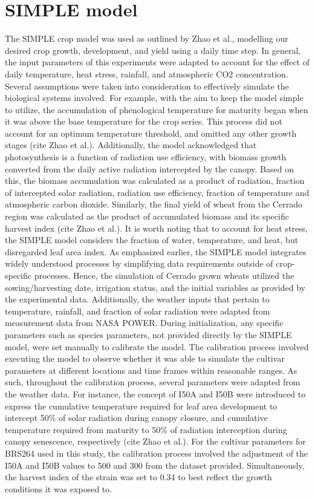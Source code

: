 \documentclass[11pt]{article}
\begin{document}
\section{SIMPLE model}
\label{sec:org2fbf11b}
The SIMPLE crop model was used as outlined by Zhao et al., modelling our desired crop growth, development, and yield using a daily time step. In general, the input parameters of this experiments were adapted to account for the effect of daily temperature, heat stress, rainfall, and atmospheric CO2 concentration. Several assumptions were taken into consideration to effectively simulate the biological systems involved. 
For example, with the aim to keep the model simple to utilize, the accumulation of phenological temperature for maturity began when it was above the base temperature for the crop series. This process did not account for an optimum temperature threshold, and omitted any other growth stages (cite Zhao et al.). Additionally, the model acknowledged that photosynthesis is a function of radiation use efficiency, with biomass growth converted from the daily active radiation intercepted by the canopy. Based on this, the biomass accumulation was calculated as a product of radiation, fraction of intercepted solar radiation, radiation use efficiency, fraction of temperature and atmospheric carbon dioxide. Similarly, the final yield of wheat from the Cerrado region was calculated as the product of accumulated biomass and its specific harvest index (cite Zhao et al.). It is worth noting that to account for heat stress, the SIMPLE model considers the fraction of water, temperature, and heat, but disregarded leaf area index.
As emphasized earlier, the SIMPLE model integrates widely understood processes by simplifying data requirements outside of crop-specific processes. Hence, the simulation of Cerrado grown wheats utilized the sowing/harvesting date, irrigation status, and the initial variables as provided by the experimental data. Additionally, the weather inputs that pertain to temperature, rainfall, and fraction of solar radiation were adapted from measurement data from NASA POWER. During initialization, any specific parameters such as species parameters, not provided directly by the SIMPLE model, were set manually to calibrate the model. 
The calibration process involved executing the model to observe whether it was able to simulate the cultivar parameters at different locations and time frames within reasonable ranges. As such, throughout the calibration process, several parameters were adapted from the weather data. For instance, the concept of I50A and I50B were introduced to express the cumulative temperature required for leaf area development to intercept 50\% of solar radiation during canopy closure, and cumulative temperature required from maturity to 50\% of radiation interception during canopy senescence, respectively (cite Zhao et al.). For the cultivar parameters for BRS264 used in this study, the calibration process involved the adjustment of the I50A and I50B values to 500 and 300 from the dataset provided. Simultaneously, the harvest index of the strain was set to 0.34 to best reflect the growth conditions it was exposed to. 
\end{document}
